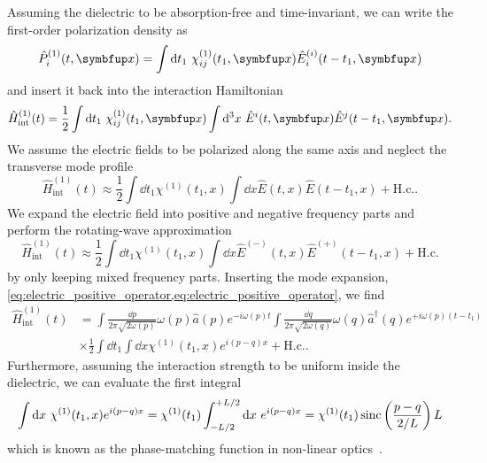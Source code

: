 Assuming the dielectric to be absorption-free and time-invariant, we can write the first-order polarization density as
\begin{equation}
	\hat{P}_i^{(1)}(t,\vb{x})
	=
	\int\dd{t_1}
	\chi_{ij}^{(1)}(t_1,\vb{x})
	\hat{E}_i^{(i)}(t-t_1,\vb{x})
\end{equation}
and insert it back into the interaction Hamiltonian
\begin{equation}
	\hat{H}_\text{int}^{(1)}(t)
	=	
	\frac{1}{2}
	\int\dd{t_1}
	\chi_{ij}^{(1)}(t_1,\vb{x})
	\int\dd[3]{x}
	\hat{E}^i(t,\vb{x})
	\hat{E}^j(t-t_1,\vb{x})
	.
\end{equation}
We assume the electric fields to be polarized along the same axis and neglect the transverse mode profile
\begin{equation}
	\hat{H}_\text{int}^{(1)}(t)
	\approx
	\frac{1}{2}
	\int\dd{t_1}
	\chi^{(1)}(t_1,x)
	\int\dd{x}
	\hat{E}(t,x)
	\hat{E}(t-t_1,x)
	+
	\text{H.c.}
	.
\end{equation}
We expand the electric field into positive and negative frequency parts and perform the rotating-wave approximation
\begin{equation}
	\hat{H}_\text{int}^{(1)}(t)
	\approx
	\frac{1}{2}
	\int\dd{t_1}
	\chi^{(1)}(t_1,x)
	\int\dd{x}
	\hat{E}^{(-)}(t,x)
	\hat{E}^{(+)}(t-t_1,x)
	+
	\text{H.c.}
\end{equation}
by only keeping mixed frequency parts.
Inserting the mode expansion, \cref{eq:electric_positive_operator,eq:electric_positive_operator}, we find
\begin{equation}
	\begin{split}
		\hat{H}_\text{int}^{(1)}(t)
		&=
		\int\frac{\dd{p}}{2\pi\sqrt{2\omega(p)}}
		\omega(p)
		\hat{a}(p)
		e^{-i\omega(p)t}
		\int\frac{\dd{q}}{2\pi\sqrt{2\omega(q)}}
		\omega(q)
		\hat{a}^\dagger(q)
		e^{+i\omega(p)(t-t_1)}
		\\
		&\times
		\frac{1}{2}
		\int\dd{t_1}
		\int\dd{x}
		\chi^{(1)}(t_1,x)
		e^{i(p-q)x}
		+
		\text{H.c.}
		.
	\end{split}
\end{equation}
Furthermore, assuming the interaction strength to be uniform inside the dielectric, we can evaluate the first integral
\begin{equation}
	\int\dd{x}
	\chi^{(1)}(t_1,x)
	e^{i(p-q)x}
	=
	\chi^{(1)}(t_1)
	\int_{-L/2}^{+L/2}\dd{x}
	e^{i(p-q)x}
	=
	\chi^{(1)}(t_1)
	\sinc\left(\frac{p-q}{2/L}\right)
	L
\end{equation}
which is known as the phase-matching function in non-linear optics~\cite[p.~33]{QuesadaMejia2015}.
